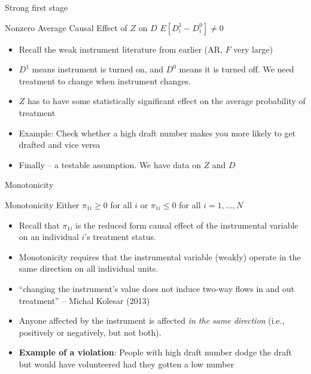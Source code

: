 \documentclass{beamer}
\begin{document}
\begin{frame}{Strong first stage}
	
	\begin{block}{Nonzero Average Causal Effect of $Z$ on $D$}
	$E[D^1_{i} - D^0_{i}]\neq{0}$
	\end{block}
				
\begin{itemize}
\item Recall the weak instrument literature from earlier (AR, $F$ very large)
\item $D^1$ means instrument is turned on, and $D^0$ means it is turned off. We need treatment to change when instrument changes.
\item $Z$ has to have some statistically significant effect on the average probability of treatment
\item Example: Check whether a high draft number makes you more likely to get drafted and vice versa
\item Finally -- a testable assumption. We have data on $Z$ and $D$
\end{itemize}

\end{frame}			


\begin{frame}{Monotonicity}
	
	\begin{block}{Monotonicity}
	Either $\pi_{1i}\geq{0}$ for all $i$ or $\pi_{1i}\leq{0}$ for all $i=1, \dots, N$
	\end{block}

\begin{itemize}

\item Recall that $\pi_{1i}$ is the reduced form causal effect of the instrumental variable on an individual $i$'s treatment status.  
\item Monotonicity requires that the instrumental variable (weakly) operate in the same direction on all individual units.  
\item ``changing the instrument's value does not induce two-way flows in and out treatment'' -- Michal Kolesar (2013)
\item Anyone affected by the instrument is affected \emph{in the same direction} (i.e., positively or negatively, but not both).
\item \textbf{Example of a violation}: People with high draft number dodge the draft but would have volunteered had they gotten a low number

\end{itemize}

\end{frame}
\end{document}
